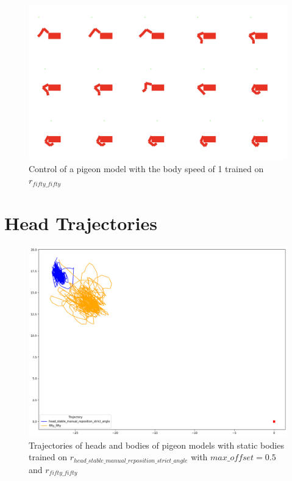   \begin{figure}[H]
      \centering
      \includegraphics[width=1\textwidth]{figures/frames/frames_005.png}
      \caption{Control of a pigeon model with the body speed of 1 trained on $r_{fifty\_fifty}$}
      \label{fig:fifty_fifty_body_speed_1}
  \end{figure}

\section{Head Trajectories}


  \begin{figure}[H]
      \centering
      \includegraphics[width=1\textwidth]{figures/head_tracking_results/pigeon_bs_0.png}
      \caption{Trajectories of heads and bodies of pigeon models with static bodies trained on $r_{head\_stable\_manual\_reposition\_strict\_angle}$ with $max\_offset = 0.5$ and $r_{fifty\_fifty}$}
      \label{fig:head_bs_0}
  \end{figure}

